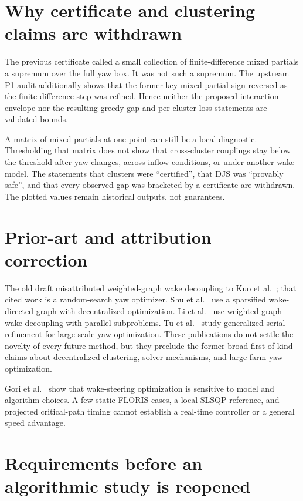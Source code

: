 \documentclass[wes, manuscript]{copernicus}
\begin{document}
\section{Why certificate and clustering claims are withdrawn}
\label{sec:certificate}

The previous certificate called a small collection of finite-difference mixed partials a supremum over the full yaw box. It was not such a supremum. The upstream P1 audit additionally shows that the former key mixed-partial sign reversed as the finite-difference step was refined. Hence neither the proposed interaction envelope nor the resulting greedy-gap and per-cluster-loss statements are validated bounds.

A matrix of mixed partials at one point can still be a local diagnostic. Thresholding that matrix does not show that cross-cluster couplings stay below the threshold after yaw changes, across inflow conditions, or under another wake model. The statements that clusters were ``certified'', that DJS was ``provably safe'', and that every observed gap was bracketed by a certificate are withdrawn. The plotted values remain historical outputs, not guarantees.

\section{Prior-art and attribution correction}
\label{sec:priorart}

The old draft misattributed weighted-graph wake decoupling to Kuo et al.\ \citep{kuo2020wind}; that cited work is a random-search yaw optimizer. Shu et al.\ \citep{shu2022decentralised} use a sparsified wake-directed graph with decentralized optimization. Li et al.\ \citep{li2025wgwd} use weighted-graph wake decoupling with parallel subproblems. Tu et al.\ \citep{tu2026gsr} study generalized serial refinement for large-scale yaw optimization. These publications do not settle the novelty of every future method, but they preclude the former broad first-of-kind claims about decentralized clustering, solver mechanisms, and large-farm yaw optimization.

Gori et al.\ \citep{gori2023sensitivity} show that wake-steering optimization is sensitive to model and algorithm choices. A few static FLORIS cases, a local SLSQP reference, and projected critical-path timing cannot establish a real-time controller or a general speed advantage.

\section{Requirements before an algorithmic study is reopened}
\label{sec:requirements}
\end{document}
